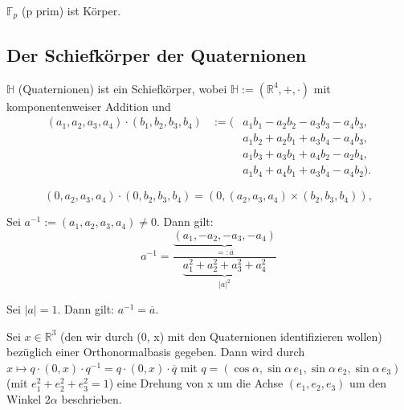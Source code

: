 \documentclass[10pt]{scrbook}
\begin{document}
\begin{Bsp}
$\mathbb{F}_p$ (p prim) ist Körper.
\end{Bsp}

\subsection{Der Schiefkörper der Quaternionen}
\begin{Bsp}
$\mathbb{H}$ (Quaternionen) ist ein Schiefkörper, wobei $\mathbb{H}:=(\mathbb{R}^4, +, \cdot)$ mit komponentenweiser Addition und
\begin{eqnarray}
	(a_1, a_2, a_3, a_4)\cdot (b_1, b_2, b_3, b_4) & := (& a_1 b_1-a_2 b_2-a_3 b_3-a_4 b_3, \nonumber \\
	& & a_1 b_2+a_2 b_1+a_3 b_4-a_4 b_3, \nonumber \\
	& & a_1 b_3+a_3 b_1+a_4 b_2-a_2 b_4, \nonumber \\
	& & a_1 b_4+a_4 b_1+a_3 b_4-a_4 b_2)
	\label{eq:quaternionen_multiplikation}.
\end{eqnarray}
\end{Bsp}

\begin{Bem}
\begin{displaymath}
	(0, a_2, a_3, a_4)\cdot (0, b_2, b_3, b_4)=\left(0, (a_2, a_3, a_4) \times (b_2, b_3, b_4)\right),
\end{displaymath}
\end{Bem}

\begin{Le}
Sei $a^{-1}:=(a_1, a_2, a_3, a_4)\neq 0$. Dann gilt: 
\begin{equation}
	a^{-1}=\frac{\underbrace{(a_1, -a_2, -a_3, -a_4)}_{=:\overline{a}}}{\underbrace{a_1^2+a_2^2+a_3^2+a_4^2}_{\left|a\right|^2}}
	\label{eq:inverses_quaternion}
\end{equation}
\end{Le}

\begin{Kor}
Sei $\left|a\right|=1$. Dann gilt: $a^{-1}=\overline{a}$.
\end{Kor}

\begin{Sa}
Sei $x\in \mathbb{R}^3$ (den wir durch (0, x) mit den Quaternionen identifizieren wollen) bezüglich einer Orthonormalbasis gegeben. Dann wird durch $x\mapsto q\cdot (0, x)\cdot q^{-1}=q\cdot (0, x) \cdot\overline{q}$ mit 
$q=(\cos \alpha, \sin \alpha\,e_1, \sin \alpha\,e_2, \sin \alpha\,e_3)$ (mit $e_1^2+e_2^2+e_3^2=1$) eine Drehung von x um die Achse $(e_1, e_2, e_3)$ um den Winkel $2 \alpha$ beschrieben.
\end{Sa}
\end{document}
